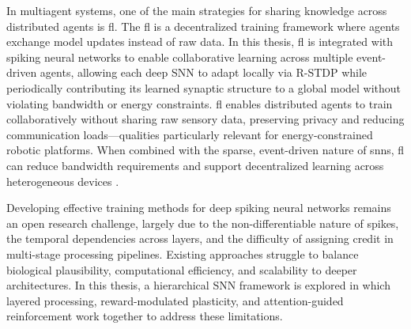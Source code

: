 In multiagent systems, one of the main strategies for sharing knowledge across distributed agents is \ac{fl}. The \ac{fl} is a decentralized training framework where agents exchange model updates instead of raw data. In this thesis, \ac{fl} is integrated with spiking neural networks to enable collaborative learning across multiple event-driven agents, allowing each deep SNN to adapt locally via R-STDP while periodically contributing its learned synaptic structure to a global model without violating bandwidth or energy constraints. \ac{fl} enables distributed agents to train collaboratively without sharing raw sensory data, preserving privacy and reducing communication loads—qualities particularly relevant for energy-constrained robotic platforms. When combined with the sparse, event-driven nature of \ac{snn}s, \ac{fl} can reduce bandwidth requirements and support decentralized learning across heterogeneous devices \cite{Ch_1_R4, Ch_1_R5}.

Developing effective training methods for deep spiking neural networks remains an open research challenge, largely due to the non-differentiable nature of spikes, the temporal dependencies across layers, and the difficulty of assigning credit in multi-stage processing pipelines. Existing approaches struggle to balance biological plausibility, computational efficiency, and scalability to deeper architectures. In this thesis, a hierarchical SNN framework is explored in which layered processing, reward-modulated plasticity, and attention-guided reinforcement work together to address these limitations.





